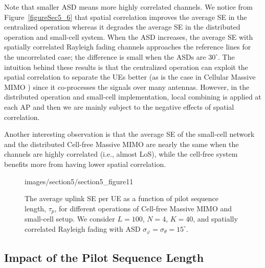 Note that smaller ASD means more highly correlated channels.
We notice from Figure~\ref{figureSec5_6} that spatial correlation improves the average SE in the centralized operation whereas it degrades the average SE in the distributed operation and small-cell system. 
When the ASD increases, the average SE with spatially correlated Rayleigh fading channels approaches the reference lines for the uncorrelated case; the difference is small when the ASDs are $30^\circ$. The intuition behind these results is that the centralized operation can exploit the spatial correlation to separate the UEs better (as is the case in Cellular Massive MIMO \cite[Sec.~4.1.5]{massivemimobook}) since it co-processes the signals over many antennas. However, in the distributed operation and small-cell implementation, local combining is applied at each AP and then we are mainly subject to the negative effects of spatial correlation.

Another interesting observation is that the average SE of the small-cell network and the distributed Cell-free Massive MIMO are nearly the same when the channels are highly correlated (i.e., almost \gls{LoS}), while the cell-free system benefits more from having lower spatial correlation.

\begin{figure}[t!]\centering
	\begin{overpic}[width=0.88\columnwidth,tics=10]{images/section5/section5_figure11}
	\end{overpic} 
	\caption{The average uplink SE per UE as a function of pilot sequence length, $\tau_p$, for different operations of Cell-free Massive MIMO and small-cell setup. We consider $L=100$, $N=4$, $K=40$, and spatially correlated Rayleigh fading with ASD $\sigma_{\varphi}=\sigma_{\theta}=15^{\circ}$. }    \vspace{+2mm}
	\label{figureSec5_7} 
\end{figure}


\subsection{Impact of the Pilot Sequence Length}


